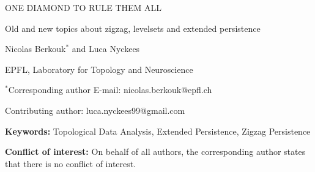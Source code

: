 \documentclass[11pt]{article}
\theoremstyle{remark}
\begin{document}
\begin{titlepage}
   \begin{center}
       \vspace*{1cm}
      
      \Large{ONE DIAMOND TO RULE THEM ALL\\}
      
       \Large{Old and new topics about zigzag, levelsets and extended persistence}

     \bigskip 
        
            
     

       \normalsize{Nicolas Berkouk$^*$ and Luca Nyckees}
       
       \medskip 
       
       EPFL, Laboratory for Topology and Neuroscience
       
       \bigskip 
       
       \bigskip 
       
       $^*$Corresponding author E-mail: nicolas.berkouk@epfl.ch
       
       Contributing author: luca.nyckees99@gmail.com
       
       \begin{abstract}
        Extended and zigzag persistence were introduced more than ten years ago, as generalizations of ordinary persistence. While overcoming certain limitations of ordinary persistence, they both enjoy nice computational properties, which make them an intermediate between ordinary and multi-parameter persistence, with already existing efficient software implementations. Nevertheless, their algebraic theory is more intricate, and in the case of extended persistence, was formulated only very recently. In this context, this paper presents a richly illustrated self-contained introduction to the foundational aspects of the topic, with an eye towards recent applications in which they are involved, such as computational sheaf theory and multi-parameter persistence.  
        \end{abstract}

  
      
      \small{\textbf{Keywords:} Topological Data Analysis, Extended Persistence, Zigzag Persistence}
      
      
      \bigskip
      
      \bigskip
      
      \small{\textbf{Conflict of interest:} On behalf of all authors, the corresponding author states that there is no conflict of interest. }
            
       
       
       \end{center}
\end{titlepage}
\end{document}
